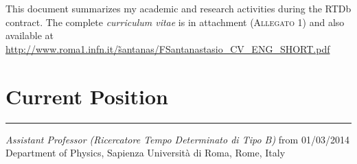 \documentclass[10pt, a4paper]{article}
\begin{document}
This document summarizes my academic and research activities during the RTDb contract.
The complete \emph{curriculum vitae} is in attachment
(\textsc{Allegato 1}) and
also available at\\ 
\href{http://www.roma1.infn.it/~santanas/FSantanastasio_CV_ENG_SHORT.pdf}{http://www.roma1.infn.it/\~santanas/FSantanastasio\_CV\_ENG\_SHORT.pdf} 

\section*{Current Position}
\vspace{-5pt}
\hrule
\vspace{10pt}
\emph{Assistant Professor (Ricercatore Tempo Determinato di Tipo B)}
from 01/03/2014 \\
Department of Physics, Sapienza Universit\`a di Roma, Rome, Italy %

\end{document}
